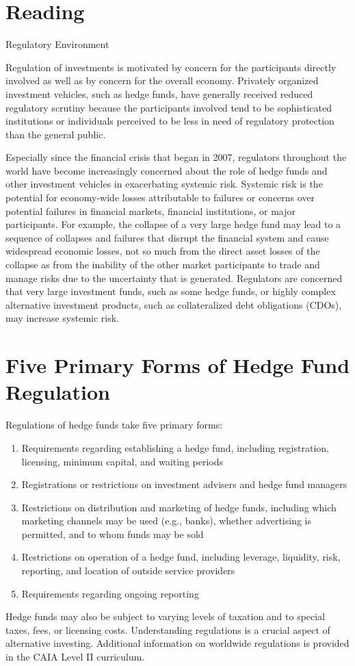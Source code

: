 \documentclass[11pt]{article}
\begin{document}
\section*{Reading}
Regulatory Environment

Regulation of investments is motivated by concern for the participants directly involved as well as by concern for the overall economy. Privately organized investment vehicles, such as hedge funds, have generally received reduced regulatory scrutiny because the participants involved tend to be sophisticated institutions or individuals perceived to be less in need of regulatory protection than the general public.

Especially since the financial crisis that began in 2007, regulators throughout the world have become increasingly concerned about the role of hedge funds and other investment vehicles in exacerbating systemic risk. Systemic risk is the potential for economy-wide losses attributable to failures or concerns over potential failures in financial markets, financial institutions, or major participants. For example, the collapse of a very large hedge fund may lead to a sequence of collapses and failures that disrupt the financial system and cause widespread economic losses, not so much from the direct asset losses of the collapse as from the inability of the other market participants to trade and manage risks due to the uncertainty that is generated. Regulators are concerned that very large investment funds, such as some hedge funds, or highly complex alternative investment products, such as collateralized debt obligations (CDOs), may increase systemic risk.

\section*{Five Primary Forms of Hedge Fund Regulation}
Regulations of hedge funds take five primary forms:

\begin{enumerate}
  \item Requirements regarding establishing a hedge fund, including registration, licensing, minimum capital, and waiting periods

  \item Registrations or restrictions on investment advisers and hedge fund managers

  \item Restrictions on distribution and marketing of hedge funds, including which marketing channels may be used (e.g., banks), whether advertising is permitted, and to whom funds may be sold

  \item Restrictions on operation of a hedge fund, including leverage, liquidity, risk, reporting, and location of outside service providers

  \item Requirements regarding ongoing reporting

\end{enumerate}

Hedge funds may also be subject to varying levels of taxation and to special taxes, fees, or licensing costs. Understanding regulations is a crucial aspect of alternative investing. Additional information on worldwide regulations is provided in the CAIA Level II curriculum.
\end{document}

